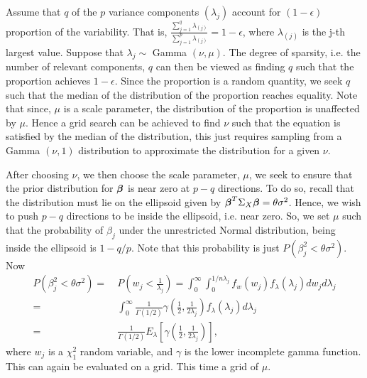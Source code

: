 \documentclass[12pt]{article}
\newcommand{\greekbold}[1]{\mbox{\boldmath $#1$}}
\newcommand{\betabf}{\greekbold{\beta}}
\begin{document}
Assume that $q$ of the $p$ variance components $(\lambda_j)$ account for $(1-\epsilon)$ proportion of the
variability. That is, $\frac{\sum_{j=1}^q \lambda_{(j)}}{\sum_{j=1}^p \lambda_{(j)}} = 1-\epsilon$, where $\lambda_{(j)}$ is the j-th largest value. Suppose that $\lambda_j \sim$ Gamma $(\nu, \mu)$. The degree of sparsity, i.e. the number of relevant components, $q$ can then be viewed as finding $q$ such that the proportion achieves $1-\epsilon$. Since the proportion is a random quantity, we seek $q$ such that the median of the distribution of the proportion reaches equality. Note that since, $\mu$ is a scale parameter, the distribution of the proportion is unaffected by $\mu$. Hence a grid search can be achieved to find $\nu$ such that the equation is satisfied by the median of the distribution, this just requires sampling from a Gamma $(\nu, 1)$ distribution to approximate the distribution for a given $\nu$.

After choosing $\nu$, we then choose the scale parameter, $\mu$, we seek to ensure that the prior distribution for $\betabf$ is near zero at $p - q$ directions. To do so, recall that the distribution must lie on the ellipsoid given by $\betabf^T \Sigma_X \betabf = \theta \sigma^2$. Hence, we wish to push $p-q$ directions to be inside the ellipsoid, i.e. near zero. So, we set $\mu$ such that the probability of $\beta_j$ under the unrestricted Normal distribution, being inside the ellipsoid is $1 - q/p$. Note that this probability is just $P(\beta_j^2 < \theta \sigma^2)$. Now
\begin{align*}
P(\beta_j^2 < \theta \sigma^2) =& \ P\left ( w_j < \frac{1}{\lambda_j} \right ) = \int_{0}^{\infty} \int_{0}^{1/n\lambda_j} f_w (w_j) f_\lambda(\lambda_j) dw_j d\lambda_j \\
=& \ \int_{0}^{\infty} \frac{1}{\Gamma(1/2)} \gamma \left ( \frac{1}{2},\frac{1}{2\lambda_j} \right ) f_\lambda(\lambda_j) d\lambda_j \\
=& \ \frac{1}{\Gamma(1/2)} E_\lambda \left [ \gamma \left ( \frac{1}{2},\frac{1}{2\lambda_j} \right ) \right ],
\end{align*}
where $w_j$ is a $\chi^2_1$ random variable, and $\gamma$ is the lower incomplete gamma function. This can again be evaluated on a grid. This time a grid of $\mu$.
\end{document}
